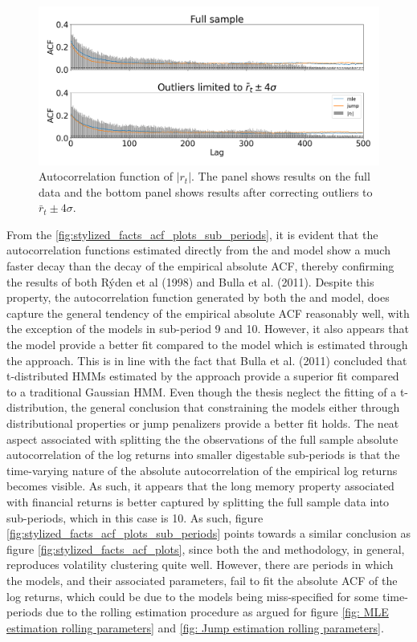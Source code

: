 \begin{figure}[H] 
    \centering
    \includegraphics[width=1.0\textwidth]{analysis/stylized_facts/images/acf_abs_outlier.png}
    \caption[Autocorrelation function of $|r_t|$]{Autocorrelation function of $|r_t|$. The panel shows results on the full data and the bottom panel shows results after correcting outliers to $\bar r_t \pm 4\sigma$.}
\label{fig:stylized_facts_acf_abs_outlier}
\end{figure}


From the \cref{fig:stylized_facts_acf_plots_sub_periods}, it is evident that the autocorrelation functions estimated directly from the \mle and \jump model show a much faster decay than the decay of the empirical absolute ACF, thereby confirming the results of both Rýden et al (1998) and Bulla et al. (2011). Despite this property, the autocorrelation function generated by both the \mle and \jump model, does capture the general tendency of the empirical absolute ACF reasonably well, with the exception of the models in sub-period 9 and 10. However, it also appears that the \jump model provide a better fit compared to the model which is estimated through the \mle approach. This is in line with the fact that Bulla et al. (2011) concluded that t-distributed HMMs estimated by the \mle approach provide a superior fit compared to a traditional Gaussian HMM. Even though the thesis neglect the fitting of a t-distribution, the general conclusion that constraining the models either through distributional properties or jump penalizers provide a better fit holds. The neat aspect associated with splitting the the observations of the full sample absolute autocorrelation of the log returns into smaller digestable sub-periods is that the time-varying nature of the absolute autocorrelation of the empirical log returns becomes visible. As such, it appears that the long memory property associated with financial returns is better captured by splitting the full sample data into sub-periods, which in this case is 10. As such, figure \ref{fig:stylized_facts_acf_plots_sub_periods} points towards a similar conclusion as figure \ref{fig:stylized_facts_acf_plots}, since both the \mle and \jump methodology, in general, reproduces volatility clustering quite well. However, there are periods in which the models, and their associated parameters, fail to fit the absolute ACF of the log returns, which could be due to the models being miss-specified for some time-periods due to the rolling estimation procedure as argued for figure \ref{fig: MLE estimation rolling parameters} and \ref{fig: Jump estimation rolling parameters}. 
